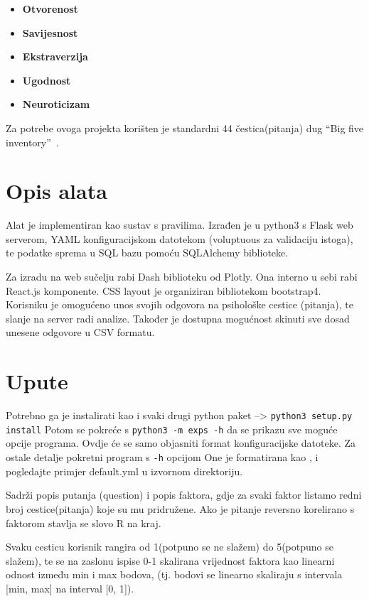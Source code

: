 \documentclass[times, utf8, seminar]{fer}
\begin{document}
\begin{itemize}
    \item \textbf{Otvorenost}
    \item \textbf{Savijesnost}
    \item \textbf{Ekstraverzija}
    \item \textbf{Ugodnost}
    \item \textbf{Neuroticizam}
\end{itemize}

Za potrebe ovoga projekta korišten je standardni 44 čestica(pitanja) dug ``Big five inventory''~\cite{john1999big}.

\chapter{Opis alata}
Alat je implementiran kao sustav s pravilima.
Izrađen je u python3 s Flask web serverom, YAML konfiguracijskom datotekom (voluptuous za validaciju istoga), te podatke sprema u SQL bazu pomoću SQLAlchemy biblioteke.

Za izradu na web sučelju rabi Dash biblioteku od Plotly.
Ona interno u sebi rabi React.js komponente.
CSS layout je organiziran bibliotekom bootstrap4.
Korisniku je omogućeno unos svojih odgovora na psihološke cestice (pitanja), te slanje na server radi analize.
Također je dostupna mogućnost skinuti sve dosad unesene odgovore u CSV formatu.
\chapter{Upute}

Potrebno ga je instalirati kao i svaki drugi python paket --> \texttt{python3 setup.py install}  Potom se pokreće s \texttt{python3 -m exps -h} da se prikazu sve moguće opcije programa.
Ovdje će se samo objasniti format konfiguracijske datoteke. Za ostale detalje pokretni program s \texttt{-h} opcijom
One je formatirana kao , i pogledajte primjer default.yml u izvornom direktoriju.

Sadrži popis putanja (question) i popis faktora, gdje za svaki faktor listamo redni broj cestice(pitanja) koje su mu pridružene. Ako je pitanje reversno korelirano s faktorom stavlja se slovo R na kraj.

Svaku cesticu korisnik rangira od 1(potpuno se ne slažem) do 5(potpuno se slažem), te se na zaslonu ispise 0-1 skalirana vrijednost faktora kao linearni odnost između min i max bodova, (tj. bodovi se linearno skaliraju s intervala [min, max] na interval [0, 1]).
\end{document}
